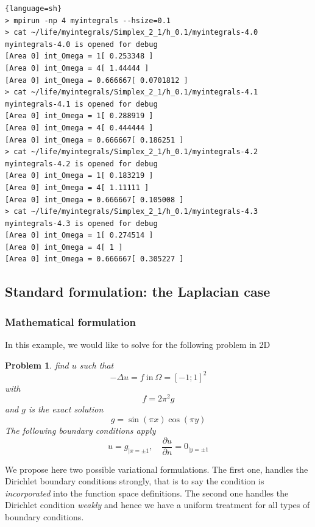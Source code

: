 \documentclass[a4paper]{book}
\newtheorem{problem}{Problem}
\begin{document}
\begin{lstlisting}{language=sh}
> mpirun -np 4 myintegrals --hsize=0.1
> cat ~/life/myintegrals/Simplex_2_1/h_0.1/myintegrals-4.0
myintegrals-4.0 is opened for debug
[Area 0] int_Omega = 1[ 0.253348 ]
[Area 0] int_Omega = 4[ 1.44444 ]
[Area 0] int_Omega = 0.666667[ 0.0701812 ]
> cat ~/life/myintegrals/Simplex_2_1/h_0.1/myintegrals-4.1
myintegrals-4.1 is opened for debug
[Area 0] int_Omega = 1[ 0.288919 ]
[Area 0] int_Omega = 4[ 0.444444 ]
[Area 0] int_Omega = 0.666667[ 0.186251 ]
> cat ~/life/myintegrals/Simplex_2_1/h_0.1/myintegrals-4.2
myintegrals-4.2 is opened for debug
[Area 0] int_Omega = 1[ 0.183219 ]
[Area 0] int_Omega = 4[ 1.11111 ]
[Area 0] int_Omega = 0.666667[ 0.105008 ]
> cat ~/life/myintegrals/Simplex_2_1/h_0.1/myintegrals-4.3
myintegrals-4.3 is opened for debug
[Area 0] int_Omega = 1[ 0.274514 ]
[Area 0] int_Omega = 4[ 1 ]
[Area 0] int_Omega = 0.666667[ 0.305227 ]
\end{lstlisting}

\subsection{Standard formulation: the Laplacian case}
\label{sec:defin-bilin-forms}
\subsubsection{Mathematical formulation}
\label{sec:math-form-3}
In this example, we would like to solve for the following problem in 2D
\begin{problem}
\label{prob:1}
 find $u$ such that
\begin{equation}
  \label{eq:1}
  -\Delta u = f\ \text{in}\ \Omega = [-1;1]^2
\end{equation}
with
\begin{equation}
  \label{eq:2}
  f= 2 \pi^2  g
\end{equation}
and $g$ is the exact solution
\begin{equation}
  \label{eq:3}
  g=\sin(\pi x) \cos(\pi y)
\end{equation}
The following boundary conditions apply
\begin{equation}
  \label{eq:4}
  u=g_{|x=\pm 1}, \quad \frac{\partial u}{\partial n} = 0_{|y=\pm 1}
\end{equation}
\end{problem}

We propose here two possible variational formulations. The first one,
handles the Dirichlet boundary conditions strongly, that is to say the
condition is \emph{incorporated} into the function space definitions.
The second one handles the Dirichlet condition \emph{weakly} and hence
we have a uniform treatment for all types of boundary conditions.
\end{document}
